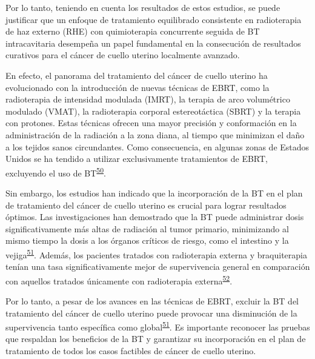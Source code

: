 \documentclass[
  a4paper,
]{scrreprt}
\begin{document}
Por lo tanto, teniendo en cuenta los resultados de estos estudios, se
puede justificar que un enfoque de tratamiento equilibrado consistente
en radioterapia de haz externo (RHE) con quimioterapia concurrente
seguida de BT intracavitaria desempeña un papel fundamental en la
consecución de resultados curativos para el cáncer de cuello uterino
localmente avanzado.

En efecto, el panorama del tratamiento del cáncer de cuello uterino ha
evolucionado con la introducción de nuevas técnicas de EBRT, como la
radioterapia de intensidad modulada (IMRT), la terapia de arco
volumétrico modulado (VMAT), la radioterapia corporal estereotáctica
(SBRT) y la terapia con protones. Estas técnicas ofrecen una mayor
precisión y conformación en la administración de la radiación a la zona
diana, al tiempo que minimizan el daño a los tejidos sanos circundantes.
Como consecuencia, en algunas zonas de Estados Unidos se ha tendido a
utilizar exclusivamente tratamientos de EBRT, excluyendo el uso de
BT\textsuperscript{\protect\hyperlink{ref-gill2014}{50}}.

Sin embargo, los estudios han indicado que la incorporación de la BT en
el plan de tratamiento del cáncer de cuello uterino es crucial para
lograr resultados óptimos. Las investigaciones han demostrado que la BT
puede administrar dosis significativamente más altas de radiación al
tumor primario, minimizando al mismo tiempo la dosis a los órganos
críticos de riesgo, como el intestino y la
vejiga\textsuperscript{\protect\hyperlink{ref-tanderup2014a}{51}}.
Además, los pacientes tratados con radioterapia externa y braquiterapia
tenían una tasa significativamente mejor de supervivencia general en
comparación con aquellos tratados únicamente con radioterapia
externa\textsuperscript{\protect\hyperlink{ref-han2013}{52}}.

Por lo tanto, a pesar de los avances en las técnicas de EBRT, excluir la
BT del tratamiento del cáncer de cuello uterino puede provocar una
disminución de la supervivencia tanto específica como
global\textsuperscript{\protect\hyperlink{ref-tanderup2014a}{51}}. Es
importante reconocer las pruebas que respaldan los beneficios de la BT y
garantizar su incorporación en el plan de tratamiento de todos los casos
factibles de cáncer de cuello uterino.
\end{document}

